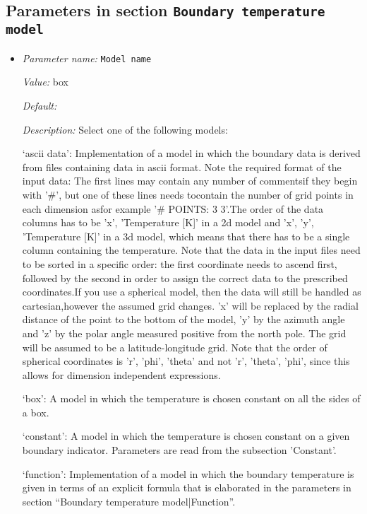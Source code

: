 \subsection{Parameters in section \tt Boundary temperature model}
\label{parameters:Boundary_20temperature_20model}

\begin{itemize}
\item {\it Parameter name:} {\tt Model name}
\label{parameters:Boundary temperature model/Model name}


{\it Value:} box


{\it Default:} 


{\it Description:} Select one of the following models:

`ascii data': Implementation of a model in which the boundary data is derived from files containing data in ascii format. Note the required format of the input data: The first lines may contain any number of commentsif they begin with '#', but one of these lines needs tocontain the number of grid points in each dimension asfor example '# POINTS: 3 3'.The order of the data columns has to be 'x', 'Temperature [K]' in a 2d model and  'x', 'y', 'Temperature [K]' in a 3d model, which means that there has to be a single column containing the temperature. Note that the data in the input files need to be sorted in a specific order: the first coordinate needs to ascend first, followed by the second in order to assign the correct data to the prescribed coordinates.If you use a spherical model, then the data will still be handled as cartesian,however the assumed grid changes. 'x' will be replaced by the radial distance of the point to the bottom of the model, 'y' by the azimuth angle and 'z' by the polar angle measured positive from the north pole. The grid will be assumed to be a latitude-longitude grid. Note that the order of spherical coordinates is 'r', 'phi', 'theta' and not 'r', 'theta', 'phi', since this allows for dimension independent expressions. 

`box': A model in which the temperature is chosen constant on all the sides of a box.

`constant': A model in which the temperature is chosen constant on a given boundary indicator.  Parameters are read from the subsection 'Constant'.

`function': Implementation of a model in which the boundary temperature is given in terms of an explicit formula that is elaborated in the parameters in section ``Boundary temperature model|Function''. 


\end{itemize}
